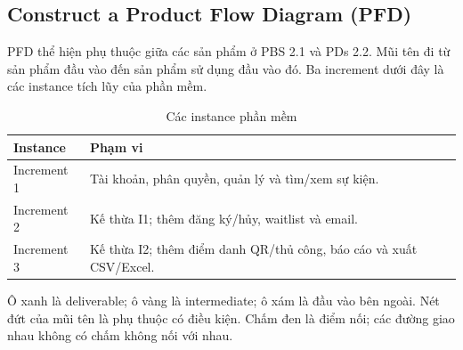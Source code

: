 \clearpage
\subsection{Construct a Product Flow Diagram (PFD)}
PFD thể hiện phụ thuộc giữa các sản phẩm ở PBS 2.1 và PDs 2.2. Mũi tên đi từ sản phẩm đầu vào đến sản phẩm sử dụng đầu vào đó. Ba increment dưới đây là các instance tích lũy của phần mềm.
\begin{table}[H]
\centering
\caption{Các instance phần mềm}
\renewcommand{\arraystretch}{1.3}
\begin{tabularx}{\textwidth}{|p{2.5cm}|X|}
\hline
\textbf{Instance} & \textbf{Phạm vi} \\ \hline
Increment 1 & Tài khoản, phân quyền, quản lý và tìm/xem sự kiện. \\ \hline
Increment 2 & Kế thừa I1; thêm đăng ký/hủy, waitlist và email. \\ \hline
Increment 3 & Kế thừa I2; thêm điểm danh QR/thủ công, báo cáo và xuất CSV/Excel. \\ \hline
\end{tabularx}
\end{table}
Ô xanh là deliverable; ô vàng là intermediate; ô xám là đầu vào bên ngoài. Nét đứt của mũi tên là phụ thuộc có điều kiện. Chấm đen là điểm nối; các đường giao nhau không có chấm không nối với nhau.

